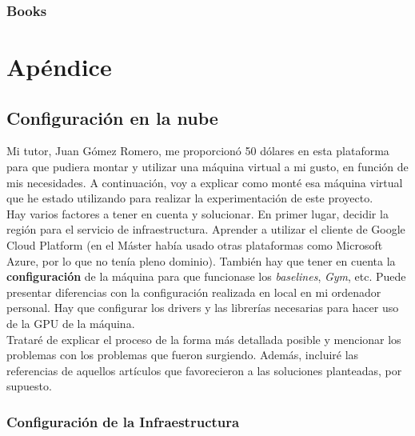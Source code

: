 \documentclass[11pt,fleqn]{book} %
\begin{document}

\section*{Books}
\printbibliography[heading=bibempty,type=book]


\appendix

\part{Apéndice}
\usechapterimagefalse
\chapter{Configuración en la nube}\label{sec:googlecloud}

Mi tutor, Juan Gómez Romero, me proporcionó 50 dólares en esta plataforma para que pudiera montar y utilizar una máquina virtual a mi gusto, en función de mis necesidades. A continuación, voy a explicar como monté esa máquina virtual que he estado utilizando para realizar la experimentación de este proyecto. \\

Hay varios factores a tener en cuenta y solucionar. En primer lugar, decidir la región para el servicio de infraestructura. Aprender a utilizar el cliente de Google Cloud Platform (en el Máster había usado otras plataformas como Microsoft Azure, por lo que no tenía pleno dominio). También hay que tener en cuenta la \textbf{configuración} de la máquina para que funcionase los \textit{baselines}, \textit{Gym}, etc. Puede presentar diferencias con la configuración realizada en local en mi ordenador personal. Hay que configurar los drivers y las librerías necesarias para hacer uso de la GPU de la máquina. \\

Trataré de explicar el proceso de la forma más detallada posible y mencionar los problemas con los problemas que fueron surgiendo. Además, incluiré las referencias de aquellos artículos que favorecieron a las soluciones planteadas, por supuesto. \\

\section{Configuración de la Infraestructura}\label{sec:infraestructura}
\end{document}
